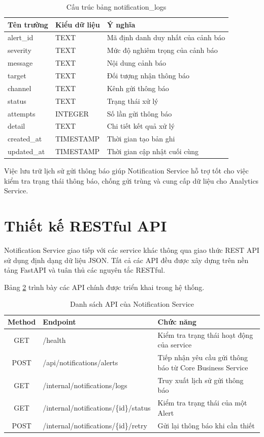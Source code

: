 \begin{table}[H]
\centering
\caption{Cấu trúc bảng notification\_logs}
\label{tab:notification-log}
\begin{tabular}{|l|l|p{7cm}|}
\hline
\textbf{Tên trường} & \textbf{Kiểu dữ liệu} & \textbf{Ý nghĩa} \\ \hline
alert\_id & TEXT & Mã định danh duy nhất của cảnh báo \\ \hline
severity & TEXT & Mức độ nghiêm trọng của cảnh báo \\ \hline
message & TEXT & Nội dung cảnh báo \\ \hline
target & TEXT & Đối tượng nhận thông báo \\ \hline
channel & TEXT & Kênh gửi thông báo \\ \hline
status & TEXT & Trạng thái xử lý \\ \hline
attempts & INTEGER & Số lần gửi thông báo \\ \hline
detail & TEXT & Chi tiết kết quả xử lý \\ \hline
created\_at & TIMESTAMP & Thời gian tạo bản ghi \\ \hline
updated\_at & TIMESTAMP & Thời gian cập nhật cuối cùng \\ \hline
\end{tabular}
\end{table}

Việc lưu trữ lịch sử gửi thông báo giúp Notification Service hỗ trợ tốt cho việc kiểm tra trạng thái thông báo, chống gửi trùng và cung cấp dữ liệu cho Analytics Service.

\section{Thiết kế RESTful API}

Notification Service giao tiếp với các service khác thông qua giao thức REST API sử dụng định dạng dữ liệu JSON. Tất cả các API đều được xây dựng trên nền tảng FastAPI và tuân thủ các nguyên tắc RESTful.

Bảng \ref{tab:api-list} trình bày các API chính được triển khai trong hệ thống.

\begin{table}[H]
\centering
\caption{Danh sách API của Notification Service}
\label{tab:api-list}
\begin{tabular}{|c|l|p{8cm}|}
\hline
\textbf{Method} & \textbf{Endpoint} & \textbf{Chức năng} \\ \hline
GET & /health & Kiểm tra trạng thái hoạt động của service \\ \hline
POST & /api/notifications/alerts & Tiếp nhận yêu cầu gửi thông báo từ Core Business Service \\ \hline
GET & /internal/notifications/logs & Truy xuất lịch sử gửi thông báo \\ \hline
GET & /internal/notifications/\{id\}/status & Kiểm tra trạng thái của một Alert \\ \hline
POST & /internal/notifications/\{id\}/retry & Gửi lại thông báo khi cần thiết \\ \hline
\end{tabular}
\end{table}


